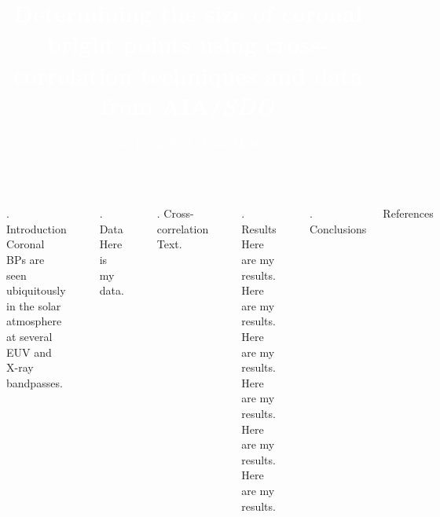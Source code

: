 \documentclass[t]{beamer}
\title{\Huge\textcolor{white}{
    Determining the size of coronal bright points using
    cross-correlation techniques and data from AIA/\textit{SDO}}}
\author{\huge\textcolor{white}{Laurel Farris, R. T. James McAteer}}
\date{}
\begin{document}
\begin{frame}[t]{}
    \maketitle
    \vfill
    \begin{columns}[t]
        \section{}
        \begin{block}{\thesection. Introduction}
            Coronal BPs are seen ubiquitously in the solar atmosphere at several
            EUV and X-ray bandpasses.
        \end{block}

        \section{}
        \begin{block}{\thesection. Data}
            Here is my data.
        \end{block}

        \section{}
        \begin{block}{\thesection. Cross-correlation}
            Text.
        \end{block}


        \section{}
        \begin{block}{\thesection. Results}
            Here are my results. Here are my results.
            Here are my results. Here are my results.
            Here are my results. Here are my results.
        \end{block}

        \section{}
        \begin{block}{\thesection. Conclusions}
        \end{block}

        \begin{block}{References}
        \end{block}

    \end{columns}

\end{frame}
\end{document}
